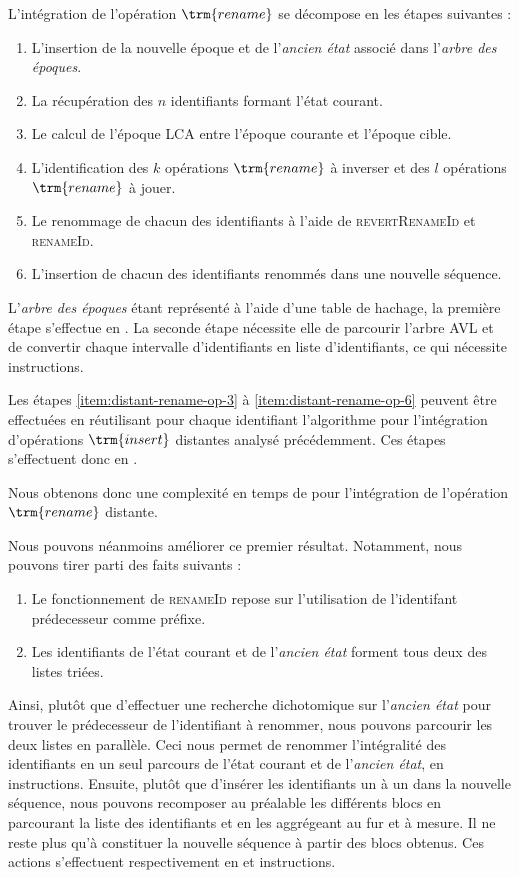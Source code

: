 L'intégration de l'opération $\trm{rename}$ se décompose en les étapes suivantes :
\begin{enumerate}
  \item L'insertion de la nouvelle époque et de l'\emph{ancien état} associé dans l'\emph{arbre des époques}.
  \item La récupération des $n$ identifiants formant l'état courant.
  \item \label{item:distant-rename-op-3} Le calcul de l'époque \ac{LCA} entre l'époque courante et l'époque cible.
  \item L'identification des $k$ opérations $\trm{rename}$ à inverser et des $l$ opérations $\trm{rename}$ à jouer.
  \item Le renommage de chacun des identifiants à l'aide de \textsc{revertRenameId} et \textsc{renameId}.
  \item \label{item:distant-rename-op-6} L'insertion de chacun des identifiants renommés dans une nouvelle séquence.
\end{enumerate}
L'\emph{arbre des époques} étant représenté à l'aide d'une table de hachage, la première étape s'effectue en .
La seconde étape nécessite elle de parcourir l'arbre AVL et de convertir chaque intervalle d'identifiants en liste d'identifiants, ce qui nécessite  instructions.

Les étapes \ref{item:distant-rename-op-3} à \ref{item:distant-rename-op-6} peuvent être effectuées en réutilisant pour chaque identifiant l'algorithme pour l'intégration d'opérations $\trm{insert}$ distantes analysé précédemment.
Ces étapes s'effectuent donc en .

Nous obtenons donc une complexité en temps de  pour l'intégration de l'opération $\trm{rename}$ distante.

Nous pouvons néanmoins améliorer ce premier résultat.
Notamment, nous pouvons tirer parti des faits suivants :
\begin{enumerate}
  \item Le fonctionnement de \textsc{renameId} repose sur l'utilisation de l'identifant prédecesseur comme préfixe.
  \item Les identifiants de l'état courant et de l'\emph{ancien état} forment tous deux des listes triées.
\end{enumerate}
Ainsi, plutôt que d'effectuer une recherche dichotomique sur l'\emph{ancien état} pour trouver le prédecesseur de l'identifiant à renommer, nous pouvons parcourir les deux listes en parallèle.
Ceci nous permet de renommer l'intégralité des identifiants en un seul parcours de l'état courant et de l'\emph{ancien état}, \ie en  instructions.
Ensuite, plutôt que d'insérer les identifiants un à un dans la nouvelle séquence, nous pouvons recomposer au préalable les différents blocs en parcourant la liste des identifiants et en les aggrégeant au fur et à mesure.
Il ne reste plus qu'à constituer la nouvelle séquence à partir des blocs obtenus.
Ces actions s'effectuent respectivement en  et  instructions.


